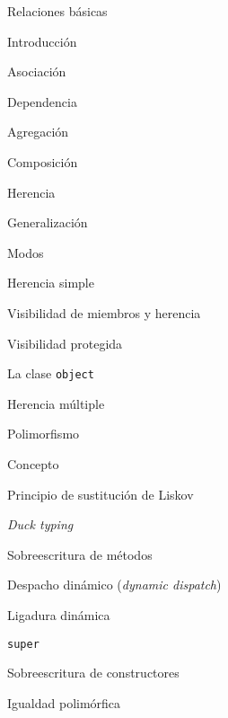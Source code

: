 \begin{longenum}
    \begin{longenum}
        \item Relaciones básicas
        \begin{longenum}
            \item Introducción
            \item Asociación
            \item Dependencia
            \item Agregación
            \item Composición
        \end{longenum}
        \item Herencia
        \begin{longenum}
            \item Generalización
            \item Modos
            \begin{longenum}
                \item Herencia simple
                \item Visibilidad de miembros y herencia
                \begin{longenum}
                    \item Visibilidad protegida
                \end{longenum}
                \item La clase \texttt{object}
                \item Herencia múltiple
            \end{longenum}
        \end{longenum}
        \item Polimorfismo
        \begin{longenum}
            \item Concepto
            \item Principio de sustitución de Liskov
            \item \textit{Duck typing}
            \item Sobreescritura de métodos
            \begin{longenum}
                \item Despacho dinámico (\textit{dynamic dispatch})
            \end{longenum}
            \item Ligadura dinámica
            \item \texttt{super}
            \item Sobreescritura de constructores
            \item Igualdad polimórfica

\end{longenum}
\end{longenum}
\end{longenum}
